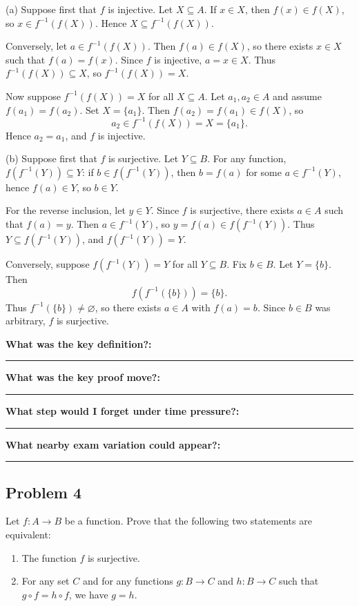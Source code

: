 \documentclass[12pt]{article}
\newcommand{\writespace}[1]{\vspace*{#1}}
\newcommand{\fillfieldbig}[2]{%
  \par\noindent\textbf{#1:}\par
  \writespace{#2}
  \noindent\rule{\linewidth}{0.35pt}\par\vspace{0.15in}%
}
\newenvironment{problemstatementbox}[1]{%
  \begin{tcolorbox}[
    enhanced,
    breakable,
    colback=probblue,
    colframe=blue!55!black,
    fonttitle=\bfseries,
    title={Problem Statement\hfill #1}
  ]
}{%
  \end{tcolorbox}
}
\newenvironment{solutionbox}[1]{%
  \begin{tcolorbox}[
    enhanced,
    breakable,
    colback=solgreen,
    colframe=green!45!black,
    fonttitle=\bfseries,
    title={#1}
  ]
}{%
  \end{tcolorbox}
}
\newcommand{\reflectionpage}[1]{%
  \begin{tcolorbox}[
    enhanced,
    colback=reflectcyan,
    colframe=cyan!55!black,
    fonttitle=\bfseries,
    title={Reflection \& Variation\hfill #1},
    height=8.45in
  ]
  \fillfieldbig{What was the key definition?}{1.15in}
  \fillfieldbig{What was the key proof move?}{1.15in}
  \fillfieldbig{What step would I forget under time pressure?}{1.15in}
  \fillfieldbig{What nearby exam variation could appear?}{1.35in}
  \end{tcolorbox}
}
\begin{document}
\newpage
\begin{solutionbox}{Student-Derived Solution (No official solution available)}
(a) Suppose first that \(f\) is injective. Let \(X\subseteq A\). If \(x\in X\), then \(f(x)\in f(X)\), so \(x\in f^{-1}(f(X))\). Hence \(X\subseteq f^{-1}(f(X))\).

Conversely, let \(a\in f^{-1}(f(X))\). Then \(f(a)\in f(X)\), so there exists \(x\in X\) such that \(f(a)=f(x)\). Since \(f\) is injective, \(a=x\in X\). Thus \(f^{-1}(f(X))\subseteq X\), so \(f^{-1}(f(X))=X\).

Now suppose \(f^{-1}(f(X))=X\) for all \(X\subseteq A\). Let \(a_1,a_2\in A\) and assume \(f(a_1)=f(a_2)\). Set \(X=\{a_1\}\). Then \(f(a_2)=f(a_1)\in f(X)\), so
\[
  a_2\in f^{-1}(f(X))=X=\{a_1\}.
\]
Hence \(a_2=a_1\), and \(f\) is injective.

(b) Suppose first that \(f\) is surjective. Let \(Y\subseteq B\). For any function, \(f(f^{-1}(Y))\subseteq Y\): if \(b\in f(f^{-1}(Y))\), then \(b=f(a)\) for some \(a\in f^{-1}(Y)\), hence \(f(a)\in Y\), so \(b\in Y\).

For the reverse inclusion, let \(y\in Y\). Since \(f\) is surjective, there exists \(a\in A\) such that \(f(a)=y\). Then \(a\in f^{-1}(Y)\), so \(y=f(a)\in f(f^{-1}(Y))\). Thus \(Y\subseteq f(f^{-1}(Y))\), and \(f(f^{-1}(Y))=Y\).

Conversely, suppose \(f(f^{-1}(Y))=Y\) for all \(Y\subseteq B\). Fix \(b\in B\). Let \(Y=\{b\}\). Then
\[
  f(f^{-1}(\{b\}))=\{b\}.
\]
Thus \(f^{-1}(\{b\})\neq\varnothing\), so there exists \(a\in A\) with \(f(a)=b\). Since \(b\in B\) was arbitrary, \(f\) is surjective.
\end{solutionbox}

\newpage
\reflectionpage{Homework 1, Problem 3}

\newpage
\subsection{Problem 4}

\begin{problemstatementbox}{Homework 1, Problem 4}
Let \(f:A\to B\) be a function. Prove that the following two statements are equivalent:
\begin{enumerate}[label=(\alph*)]
  \item The function \(f\) is surjective.
  \item For any set \(C\) and for any functions \(g:B\to C\) and \(h:B\to C\) such that \(g\circ f=h\circ f\), we have \(g=h\).
\end{enumerate}
\end{problemstatementbox}
\end{document}
